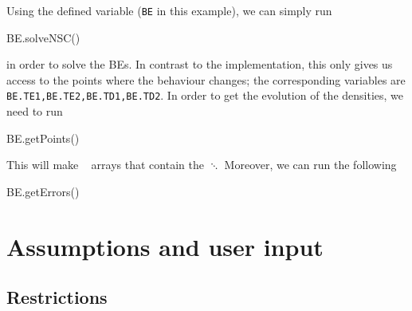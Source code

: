 \documentclass[11pt,a4paper]{article}
\begin{document}
Using the defined variable ({\tt BE} in this example), we can simply run  
%
\begin{py}
	BE.solveNSC()
\end{py}
%
in order to solve the BEs. In contrast to the \CPP implementation, this only gives us access to the points where the behaviour changes; the corresponding variables are {\tt BE.TE1,BE.TE2,BE.TD1,BE.TD2}. In order to get the evolution of the densities, we need to run 
%
\begin{py}
	BE.getPoints()
\end{py}
%
This will make ~\cite{harris2020array} arrays that contain the $\ddots$ Moreover, we can run the following
%
\begin{py}
	BE.getErrors()
\end{py}



\section{Assumptions and user input}\label{sec:assumptions}
\setcounter{equation}{0}
%
\subsection{Restrictions}\label{sec:restrictions}
\end{document}
